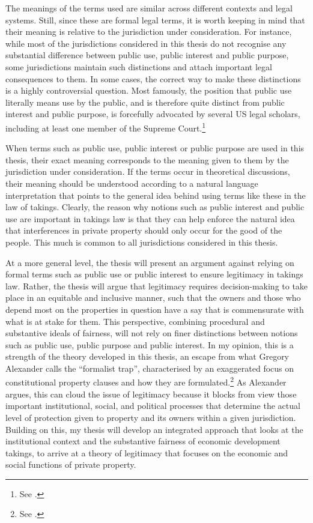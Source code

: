 {The meanings of the terms used are similar across different contexts and legal systems. Still, since these are formal legal terms, it is worth keeping in mind that their meaning is relative to the jurisdiction under consideration. For instance, while most of the jurisdictions considered in this thesis do not recognise any substantial difference between public use, public interest and public purpose, some jurisdictions maintain such distinctions and attach important legal consequences to them. In some cases, the correct way to make these distinctions is a highly controversial question. Most famously, the position that public use literally means use by the public, and is therefore quite distinct from public interest and public purpose, is forcefully advocated by several US legal scholars, including at least one member of the Supreme Court.\footnote{See \cite{kelo05}.}

When terms such as public use, public interest or public purpose are used in this thesis, their exact meaning corresponds to the meaning given to them by the jurisdiction under consideration. If the terms occur in theoretical discussions, their meaning should be understood according to a natural language interpretation that points to the general idea behind using terms like these in the law of takings. Clearly, the reason why notions such as public interest and public use are important in takings law is that they can help enforce the natural idea that interferences in private property should only occur for the good of the people. This much is common to all jurisdictions considered in this thesis. %

At a more general level, the thesis will present an argument against relying on formal terms such as public use or public interest to ensure legitimacy in takings law. Rather, the thesis will argue that legitimacy requires decision-making to take place in an equitable and inclusive manner, such that the owners and those who depend most on the properties in question have a say that is commensurate with what is at stake for them. This perspective, combining procedural and substantive ideals of fairness, will not rely on finer distinctions between notions such as public use, public purpose and public interest. In my opinion, this is a strength of the theory developed in this thesis, an escape from what Gregory Alexander calls the ``formalist trap'', characterised by an exaggerated focus on constitutional property clauses and how they are formulated.\footnote{See \cite[Chapter 1]{alexander06}.} As Alexander argues, this can cloud the issue of legitimacy because it blocks from view those important institutional, social, and political processes that determine the actual level of protection given to property and its owners within a given jurisdiction. Building on this, my thesis will develop an integrated approach that looks at the institutional context and the substantive fairness of economic development takings, to arrive at a theory of legitimacy that focuses on the economic and social functions of private property.

}
